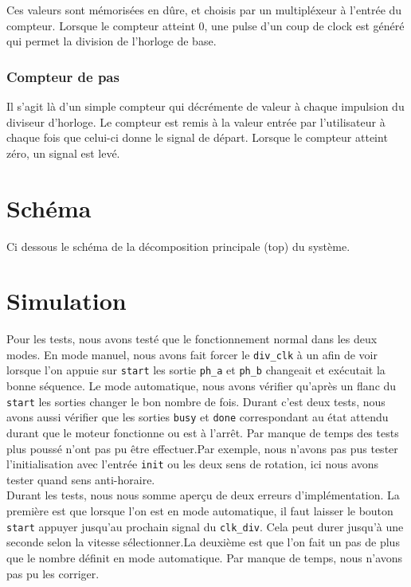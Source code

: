 \documentclass[10pt,a4paper]{article}
\begin{document}
Ces valeurs sont mémorisées en dûre, et choisis par un multipléxeur à l'entrée du compteur.
Lorsque le compteur atteint 0, une pulse d'un coup de clock est généré qui permet la division de l'horloge de base.

\subsubsection{Compteur de pas}
Il s'agit là d'un simple compteur qui décrémente de valeur à chaque impulsion du diviseur d'horloge.
Le compteur est remis à la valeur entrée par l'utilisateur à chaque fois que celui-ci donne le signal de départ.
Lorsque le compteur atteint zéro, un signal est levé.
\newpage
\section{Schéma}
Ci dessous le schéma de la décomposition principale (top) du système.


\newpage
\section{Simulation}
Pour les tests, nous avons testé que le fonctionnement normal dans les deux modes. En mode manuel, nous avons fait forcer le \texttt{div\_clk} à un afin de voir lorsque l'on appuie sur \texttt{start} les sortie \texttt{ph\_a} et \texttt{ph\_b} changeait et exécutait la bonne séquence. Le mode automatique, nous avons vérifier qu'après un flanc du \texttt{start} les sorties changer le bon nombre de fois. Durant c'est deux tests, nous avons aussi vérifier que les sorties \texttt{busy} et \texttt{done} correspondant au état attendu durant que le moteur fonctionne ou est à l'arrêt. Par manque de temps des tests plus poussé n'ont pas pu être effectuer.Par exemple, nous n'avons pas pus tester l'initialisation avec l'entrée \texttt{init} ou les deux sens de rotation, ici nous avons tester quand sens anti-horaire.\\

Durant les tests, nous nous somme aperçu de deux erreurs d'implémentation. La première est que lorsque l'on est en mode automatique, il faut laisser le bouton \texttt{start} appuyer jusqu'au prochain signal du \texttt{clk\_div}. Cela peut durer jusqu'à une seconde selon la vitesse sélectionner.La deuxième est que l'on fait un pas de plus que le nombre définit en mode automatique. Par manque de temps, nous n'avons pas pu les corriger.
\end{document}
